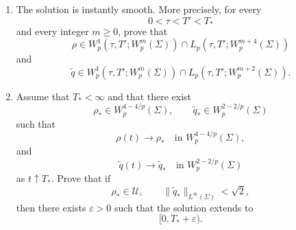 \documentclass[10pt,a4paper]{article}
\theoremstyle{definition}
\begin{document}
\begin{enumerate}
  Prove geometric uniqueness in the corresponding maximal-regularity class:
  any two solutions with the same initial oriented surface and the same
  initial scalar field determine the same evolving oriented surfaces and the
  same geometric scalar field.

  Consequently, prove uniqueness up to time-dependent reparametrization. More
  precisely, if $F_i(t,\cdot):M_i\to\mathbb R^3$, $i=1,2$, are two
  parametrized embedded solutions representing the same initial geometric
  data, and
  \begin{equation}
    u_i(t)=q_i(t)\circ F_i(t),
  \end{equation}
  then there exists a family of diffeomorphisms
  \begin{equation}
    \phi_t:M_2\longrightarrow M_1
  \end{equation}
  such that
  \begin{equation}
    F_2(t)=F_1(t)\circ\phi_t,
    \qquad
    u_2(t)=u_1(t)\circ\phi_t.
  \end{equation}

  \item The solution is instantly smooth. More precisely, for every
  \begin{equation}
    0<\tau<T'<T_*
  \end{equation}
  and every integer $m\geq0$, prove that
  \begin{equation}
    \rho
    \in
    W_p^1(\tau,T';W_p^m(\Sigma))
    \cap
    L_p(\tau,T';W_p^{m+4}(\Sigma))
  \end{equation}
  and
  \begin{equation}
    \widetilde q
    \in
    W_p^1(\tau,T';W_p^m(\Sigma))
    \cap
    L_p(\tau,T';W_p^{m+2}(\Sigma)).
  \end{equation}

  \item Assume that $T_*<\infty$ and that there exist
  \begin{equation}
    \rho_*\in W_p^{4-4/p}(\Sigma),
    \qquad
    \widetilde q_*\in W_p^{2-2/p}(\Sigma)
  \end{equation}
  such that
  \begin{equation}
    \rho(t)\longrightarrow\rho_*
    \quad\text{in }W_p^{4-4/p}(\Sigma),
  \end{equation}
  and
  \begin{equation}
    \widetilde q(t)\longrightarrow\widetilde q_*
    \quad\text{in }W_p^{2-2/p}(\Sigma)
  \end{equation}
  as $t\uparrow T_*$. Prove that if
  \begin{equation}
    \rho_*\in\mathcal U,
    \qquad
    \lVert\widetilde q_*\rVert_{L^\infty(\Sigma)}<\sqrt2,
  \end{equation}
  then there exists $\varepsilon>0$ such that the solution extends to
  \begin{equation}
    [0,T_*+\varepsilon).
  \end{equation}


\end{enumerate}
\end{document}
